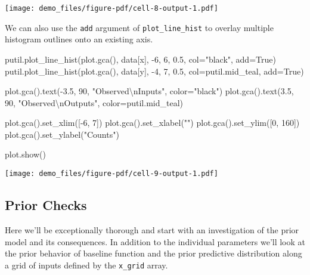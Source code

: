 \documentclass[
  letterpaper,
  DIV=11,
  numbers=noendperiod]{scrartcl}
\newenvironment{Shaded}{\begin{snugshade}}{\end{snugshade}}
\newcommand{\CharTok}[1]{\textcolor[rgb]{0.13,0.47,0.30}{#1}}
\newcommand{\DecValTok}[1]{\textcolor[rgb]{0.68,0.00,0.00}{#1}}
\newcommand{\FloatTok}[1]{\textcolor[rgb]{0.68,0.00,0.00}{#1}}
\newcommand{\NormalTok}[1]{\textcolor[rgb]{0.00,0.23,0.31}{#1}}
\newcommand{\OperatorTok}[1]{\textcolor[rgb]{0.37,0.37,0.37}{#1}}
\newcommand{\StringTok}[1]{\textcolor[rgb]{0.13,0.47,0.30}{#1}}
\newcommand{\VariableTok}[1]{\textcolor[rgb]{0.07,0.07,0.07}{#1}}
\begin{document}
\texttt{[image: demo\_files/figure-pdf/cell-8-output-1.pdf]}

We can also use the \texttt{add} argument of \texttt{plot\_line\_hist}
to overlay multiple histogram outlines onto an existing axis.

\begin{Shaded}
\begin{Highlighting}[]
\NormalTok{putil.plot\_line\_hist(plot.gca(), data[}\StringTok{\textquotesingle{}x\textquotesingle{}}\NormalTok{], }\OperatorTok{{-}}\DecValTok{6}\NormalTok{, }\DecValTok{6}\NormalTok{, }\FloatTok{0.5}\NormalTok{,}
\NormalTok{                     col}\OperatorTok{=}\StringTok{"black"}\NormalTok{, add}\OperatorTok{=}\VariableTok{True}\NormalTok{)}
\NormalTok{putil.plot\_line\_hist(plot.gca(), data[}\StringTok{\textquotesingle{}y\textquotesingle{}}\NormalTok{], }\OperatorTok{{-}}\DecValTok{4}\NormalTok{, }\DecValTok{7}\NormalTok{, }\FloatTok{0.5}\NormalTok{,}
\NormalTok{                     col}\OperatorTok{=}\NormalTok{putil.mid\_teal, add}\OperatorTok{=}\VariableTok{True}\NormalTok{)}

\NormalTok{plot.gca().text(}\OperatorTok{{-}}\FloatTok{3.5}\NormalTok{, }\DecValTok{90}\NormalTok{, }\StringTok{"Observed}\CharTok{\textbackslash{}n}\StringTok{Inputs"}\NormalTok{, color}\OperatorTok{=}\StringTok{"black"}\NormalTok{)}
\NormalTok{plot.gca().text(}\FloatTok{3.5}\NormalTok{, }\DecValTok{90}\NormalTok{, }\StringTok{"Observed}\CharTok{\textbackslash{}n}\StringTok{Outputs"}\NormalTok{, color}\OperatorTok{=}\NormalTok{putil.mid\_teal)}

\NormalTok{plot.gca().set\_xlim([}\OperatorTok{{-}}\DecValTok{6}\NormalTok{, }\DecValTok{7}\NormalTok{])}
\NormalTok{plot.gca().set\_xlabel(}\StringTok{""}\NormalTok{)}
\NormalTok{plot.gca().set\_ylim([}\DecValTok{0}\NormalTok{, }\DecValTok{160}\NormalTok{])}
\NormalTok{plot.gca().set\_ylabel(}\StringTok{"Counts"}\NormalTok{)}

\NormalTok{plot.show()}
\end{Highlighting}
\end{Shaded}

\texttt{[image: demo\_files/figure-pdf/cell-9-output-1.pdf]}

\subsection{Prior Checks}\label{prior-checks}

Here we'll be exceptionally thorough and start with an investigation of
the prior model and its consequences. In addition to the individual
parameters we'll look at the prior behavior of baseline function and the
prior predictive distribution along a grid of inputs defined by the
\texttt{x\_grid} array.
\end{document}
